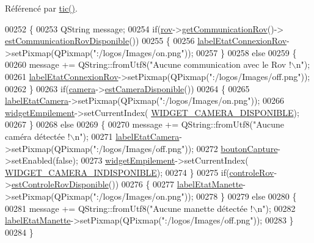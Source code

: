 Référencé par \hyperlink{class_i_h_m_rov_a4a0d3a0741d0669ede732b630eae54c6}{tic()}.


\begin{DoxyCode}
00252 \{
00253     QString message;
00254     \textcolor{keywordflow}{if}(\hyperlink{class_i_h_m_rov_a777ca33fdb295ba6b6773e880356fa1e}{rov}->\hyperlink{class_rov_ad30543625f584e28bf785a80c59506dc}{getCommunicationRov}()->
      \hyperlink{class_communication_rov_a513c26b04745fa2ae31b4533d656dfd4}{estCommunicationRovDisponible}())
00255     \{
00256         \hyperlink{class_i_h_m_rov_a83a10634509cf2d32a0bcee159eecbc3}{labelEtatConnexionRov}->setPixmap(QPixmap(\textcolor{stringliteral}{":/logos/Images/on.png"}));
00257     \}
00258     \textcolor{keywordflow}{else}
00259     \{
00260         message += QString::fromUtf8(\textcolor{stringliteral}{"Aucune communication avec le Rov !\(\backslash\)n"});
00261         \hyperlink{class_i_h_m_rov_a83a10634509cf2d32a0bcee159eecbc3}{labelEtatConnexionRov}->setPixmap(QPixmap(\textcolor{stringliteral}{":/logos/Images/off.png"}));
00262     \}
00263     \textcolor{keywordflow}{if}(\hyperlink{class_i_h_m_rov_a0eda0e4726269508d4563d98064dca9d}{camera}->\hyperlink{class_camera_afb73ab859802a143a1a00443e396143e}{estCameraDisponible}())
00264     \{
00265         \hyperlink{class_i_h_m_rov_a2ec8f0e6175a73377e4b7e96b4f29b95}{labelEtatCamera}->setPixmap(QPixmap(\textcolor{stringliteral}{":/logos/Images/on.png"}));
00266         \hyperlink{class_i_h_m_rov_a238e50788d62ae2c34b4ae6c8082d596}{widgetEmpilement}->setCurrentIndex(
      \hyperlink{ihmrov_8h_a01e28fb5361c4789cfefd3682ad1c25b}{WIDGET\_CAMERA\_DISPONIBLE});
00267     \}
00268     \textcolor{keywordflow}{else}
00269     \{
00270         message += QString::fromUtf8(\textcolor{stringliteral}{"Aucune caméra détectée !\(\backslash\)n"});
00271         \hyperlink{class_i_h_m_rov_a2ec8f0e6175a73377e4b7e96b4f29b95}{labelEtatCamera}->setPixmap(QPixmap(\textcolor{stringliteral}{":/logos/Images/off.png"}));
00272         \hyperlink{class_i_h_m_rov_a149c634582225cff29b6c8555eb7ba85}{boutonCapture}->setEnabled(\textcolor{keyword}{false});
00273         \hyperlink{class_i_h_m_rov_a238e50788d62ae2c34b4ae6c8082d596}{widgetEmpilement}->setCurrentIndex(
      \hyperlink{ihmrov_8h_a811ff9a6b410f748f13757277a45d1cd}{WIDGET\_CAMERA\_INDISPONIBLE});
00274     \}
00275     \textcolor{keywordflow}{if}(\hyperlink{class_i_h_m_rov_a405b0c05970829fbf297ee0d26af9bca}{controleRov}->\hyperlink{class_controle_rov_a9531520e50479fc2e339cd43f4c87066}{estControleRovDisponible}())
00276     \{
00277         \hyperlink{class_i_h_m_rov_ad62586ec4cef61ef851626515fd0f72a}{labelEtatManette}->setPixmap(QPixmap(\textcolor{stringliteral}{":/logos/Images/on.png"}));
00278     \}
00279     \textcolor{keywordflow}{else}
00280     \{
00281         message += QString::fromUtf8(\textcolor{stringliteral}{"Aucune manette détectée !\(\backslash\)n"});
00282         \hyperlink{class_i_h_m_rov_ad62586ec4cef61ef851626515fd0f72a}{labelEtatManette}->setPixmap(QPixmap(\textcolor{stringliteral}{":/logos/Images/off.png"}));
00283     \}
00284 \}
\end{DoxyCode}
